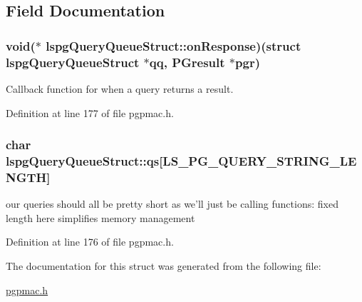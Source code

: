 \subsection{Field Documentation}
\hypertarget{structlspgQueryQueueStruct_a53bac5ae4cab775423940bff5092a831}{
\subsubsection[{on\-Response}]{\setlength{\rightskip}{0pt plus 5cm}void($\ast$ lspg\-Query\-Queue\-Struct\-::on\-Response)(struct {\bf lspg\-Query\-Queue\-Struct} $\ast$qq, P\-Gresult $\ast$pgr)}}\label{structlspgQueryQueueStruct_a53bac5ae4cab775423940bff5092a831}


Callback function for when a query returns a result. 



Definition at line 177 of file pgpmac.\-h.

\hypertarget{structlspgQueryQueueStruct_abf8c9c581b38a5e3e269eda69e47de15}{
\subsubsection[{qs}]{\setlength{\rightskip}{0pt plus 5cm}char lspg\-Query\-Queue\-Struct\-::qs\mbox{[}{\bf L\-S\-\_\-\-P\-G\-\_\-\-Q\-U\-E\-R\-Y\-\_\-\-S\-T\-R\-I\-N\-G\-\_\-\-L\-E\-N\-G\-T\-H}\mbox{]}}}\label{structlspgQueryQueueStruct_abf8c9c581b38a5e3e269eda69e47de15}


our queries should all be pretty short as we'll just be calling functions\-: fixed length here simplifies memory management 



Definition at line 176 of file pgpmac.\-h.



The documentation for this struct was generated from the following file\-:\begin{DoxyCompactItemize}
\item 
\hyperlink{pgpmac_8h}{pgpmac.\-h}\end{DoxyCompactItemize}
